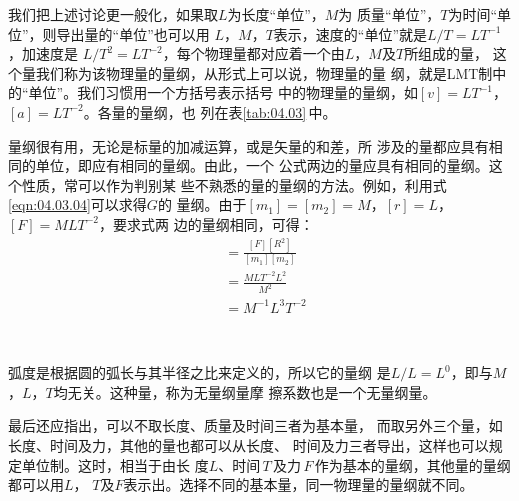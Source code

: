 我们把上述讨论更一般化，如果取$ L $为长度“单位”，$ M $为
质量“单位”，$ T $为时间“单位”，则导出量的“单位”也可以用
$ L $，$ M $，$ T $表示，速度的“单位”就是$ L / T = L T ^ { - 1 } $ ，加速度是
$ L / T ^ { 2 } = L T ^ { - 2 } $，每个物理量都对应着一个由$ L $，$ M $及$ T $所组成的量，
这个量我们称为该物理量的量纲，从形式上可以说，物理量的量
纲，就是LMT制中的“单位”。我们习惯用一个方括号表示括号
中的物理量的量纲，如$ [ v ] = L T ^ { - 1 } $， $ [ a ] = L T ^ { - 2 }$。各量的量纲，也
列在表\ref{tab:04.03}\,中。

量纲很有用，无论是标量的加减运算，或是矢量的和差，所
涉及的量都应具有相同的单位，即应有相同的量纲。由此，一个
公式两边的量应具有相同的量纲。这个性质，常可以作为判别某
些不熟悉的量的量纲的方法。例如，利用式\eqref{eqn:04.03.04}可以求得$ G $的
量纲。由于$ [ m _ { 1 } ] = [ m _ { 2 } ] = M $，$ [ r ] = L $， $ [  F ] = M L T ^ { - 2 } $，要求式两
边的量纲相同，可得：
\begin{align*}
[ G ] &= \frac { [ F ] [ R ^ 2] } { [ m _ { 1 } ] [ m _ { 2 } ] } \\ 
&= \frac { M L T ^ { - 2 } L ^ { 2 } } { M ^ { 2 } } \\
&= M ^ { - 1 } L ^ { 3 } T ^ { - 2 } 
\end{align*}

~ \vspace{-2em}

弧度是根据圆的弧长与其半径之比来定义的，所以它的量纲
是$ L / L = L ^ { 0 } $，即与$ M $，$ L $，$ T $均无关。这种量，称为无量纲量摩
擦系数也是一个无量纲量。

最后还应指出，可以不取长度、质量及时间三者为基本量，
而取另外三个量，如长度、时间及力，其他的量也都可以从长度、
时间及力三者导出，这样也可以规定单位制。这时，相当于由长
度$ L $、\!时间\,$ T $\,及力\,$ F $\,作为基本的量纲，其他量的量纲都可以用$ L $，
$ T $及$ F $表示出。选择不同的基本量，同一物理量的量纲就不同。
